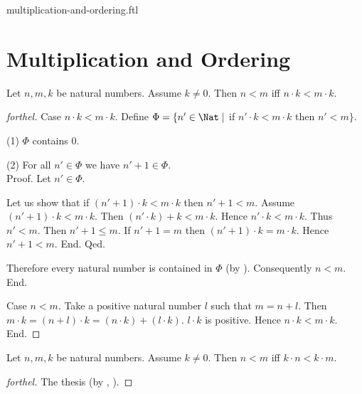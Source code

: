 \documentclass{naproche-library}
\begin{document}
\begin{smodule}{multiplication-and-ordering.ftl}

  \section*{Multiplication and Ordering}

  \begin{proposition}[forthel,id=ARITHMETIC_06_8817333933965312]
    Let $n, m, k$ be natural numbers.
    Assume $k \neq 0$.
    Then $n < m$ iff $n \cdot k < m \cdot k$.
  \end{proposition}
  \begin{proof}[forthel]
    Case $n \cdot k < m \cdot k$.
      Define $\Phi = \{ n' \in \Nat \mid$ if $n' \cdot k < m \cdot k$ then $n' < m \}$.

      (1) $\Phi$ contains $0$.

      (2) For all $n' \in \Phi$ we have $n' + 1 \in \Phi$. \\
      Proof.
        Let $n' \in \Phi$.

        Let us show that if $(n' + 1) \cdot k < m \cdot k$ then $n' + 1 < m$.
          Assume $(n' + 1) \cdot k < m \cdot k$.
          Then $(n' \cdot k) + k < m \cdot k$.
          Hence $n' \cdot k < m \cdot k$.
          Thus $n' < m$.
          Then $n' + 1 \leq m$.
          If $n' + 1 = m$ then $(n' + 1) \cdot k = m \cdot k$.
          Hence $n' + 1 < m$.
        End.
      Qed.

      Therefore every natural number is contained in $\Phi$ (by ).
      Consequently $n < m$.
    End.

    Case $n < m$.
      Take a positive natural number $l$ such that $m = n + l$.
      Then $m \cdot k = (n + l) \cdot k = (n \cdot k) + (l \cdot k)$.
      $l \cdot k$ is positive.
      Hence $n \cdot k < m \cdot k$.
    End.
  \end{proof}

  \begin{corollary}[forthel,id=ARITHMETIC_06_5048640368279552]
    Let $n, m, k$ be natural numbers.
    Assume $k \neq 0$.
    Then $n < m$ iff $k \cdot n < k \cdot m$.
  \end{corollary}
  \begin{proof}[forthel]
    The thesis (by , ).
  \end{proof}


\end{smodule}
\end{document}
